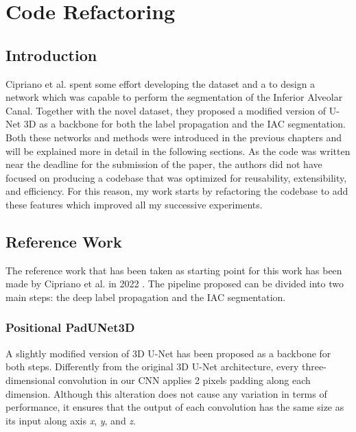 
\chapter{Code Refactoring}

\label{chp:refwork}

\def\:{\hskip0pt} %
\section{Introduction}
Cipriano et al. spent some effort developing the dataset and a to design a
network which was capable to perform the segmentation of the Inferior Alveolar
Canal.
Together with the novel dataset, they proposed a modified version of
U-Net 3D as a backbone for both the label propagation and the IAC segmentation.
Both these networks and methods were introduced in the previous
chapters and will be explained more in detail in the following sections.
As the code was written near the deadline for the submission of the paper,
the authors did not have focused on producing a codebase that was optimized for
reusability, extensibility, and efficiency.
For this reason, my work starts by refactoring the codebase to add these features
which improved all my successive experiments.

\section{Reference Work}
The reference work that has been taken as starting point for this work has been
made by Cipriano et al. in 2022 \cite{cipriano2022improving}.
The pipeline proposed can be divided into two main steps: the deep label
propagation and the IAC segmentation.

\subsection{Positional PadUNet3D}
A slightly modified version of 3D U-Net has been proposed as a backbone for both
steps. Differently from the original 3D U-Net architecture, every
three-dimensional convolution in our CNN applies 2 pixels padding along each
dimension. Although this alteration does not cause any variation in terms of
performance, it ensures that the output of each convolution has the same size as
its input along axis \emph{x}, \emph{y}, and \emph{z}.

